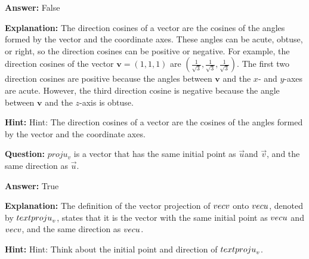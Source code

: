 \documentclass{article}
\begin{document}
                \textbf{Answer:} False
                
                \textbf{Explanation:} The direction cosines of a vector are the cosines of the angles formed by the vector and the coordinate axes. These angles can be acute, obtuse, or right, so the direction cosines can be positive or negative. For example, the direction cosines of the vector $\mathbf{v} = (1, 1, 1)$ are $(\frac{1}{\sqrt{3}}, \frac{1}{\sqrt{3}}, \frac{1}{\sqrt{3}})$. The first two direction cosines are positive because the angles between $\mathbf{v}$ and the $x$- and $y$-axes are acute. However, the third direction cosine is negative because the angle between $\mathbf{v}$ and the $z$-axis is obtuse.
                
                \textbf{Hint:} Hint: The direction cosines of a vector are the cosines of the angles formed by the vector and the coordinate axes.
                \vspace{0.5cm} 
        
            
                \textbf {Question:} $proju_v$ is a vector that has the same initial point as $\vec{u}$and $\vec{v}$, and the same direction as $\vec{u}$.
                
                \textbf{Answer:} True
                
                \textbf{Explanation:} The definition of the vector projection of \(\\vec{v}\) onto \(\\vec{u}\), denoted by \(\\text{proju}_v\), states that it is the vector with the same initial point as \(\\vec{u}\) and \(\\vec{v}\), and the same direction as \(\\vec{u}\).
                
                \textbf{Hint:} Hint: Think about the initial point and direction of \(\\text{proju}_v\).
                \vspace{0.5cm} 
        
            
\end{document}
